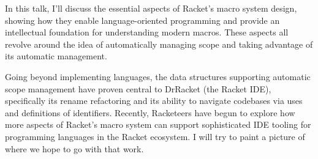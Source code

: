 \documentclass[runningheads]{llncs}
\begin{document}
In this talk, I'll discuss the essential aspects of Racket's macro
system design, showing how they enable language-oriented programming
and provide an intellectual foundation for understanding modern
macros. These aspects all revolve around the idea of automatically
managing scope and taking advantage of its automatic management.

Going beyond implementing languages, the data structures supporting
automatic scope management have proven central to DrRacket (the Racket
IDE), specifically its rename refactoring and its ability to navigate
codebases via uses and definitions of identifiers. Recently,
Racketeers have begun to explore how more aspects of Racket's macro
system can support sophisticated IDE tooling for programming languages
in the Racket ecosystem. I will try to paint a picture of where we
hope to go with that work.
\end{document}
